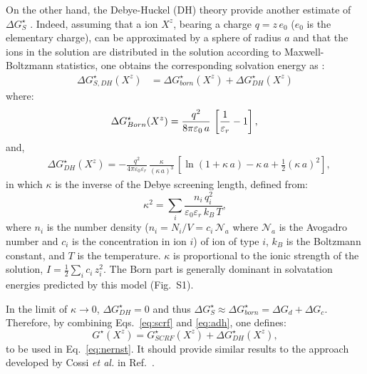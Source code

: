 \documentclass[review]{elsarticle}
\begin{document}
On the other hand, the Debye-Huckel (DH) theory provide another estimate of $\Delta G_{S}^\star$ \cite{bockrisModernElectrochemistryIonics1998}. Indeed, assuming that a ion $X^z$, bearing a charge $q = z\,e_0$ ($e_0$ is the elementary charge), can be approximated by a sphere of radius $a$ and that the ions in the solution are distributed in the solution according to Maxwell-Boltzmann statistics, one obtains the corresponding solvation energy as \cite{kontogeorgisDebyeHuckelTheoryIts2018,silvaDerivationsDebyeHuckel2022,silvaImprovingBornEquation2024}:\begin{align}
	\Delta G^\star_{S,DH}(X^z)
	&= \Delta G^\star_{born}(X^z) + \Delta G^\star_{DH}(X^z)\label{eq:adh}
\end{align}
where:
\begin{equation}
	\Delta G^\star_{Born}(X^z) =\frac{q^2}{8\pi\varepsilon_0\,a}\,\left[\frac{1}{\varepsilon_r}-1\right], \label{eq:born}\\
\end{equation}
and,
\begin{align}
	&\Delta G^\star_{DH}(X^z) = -\frac{q^2}{4\pi\varepsilon_0\varepsilon_r}\,\frac{\kappa}{(\kappa\,a)^3}\,\left[\ln(1+\kappa\,a)-\kappa\,a+\frac{1}{2}(\kappa\,a)^2\right],\label{eq:dh} \end{align}
in which $\kappa$ is the inverse of the Debye screening length, defined from:\begin{equation}
	\kappa^2 = \sum_i \frac{n_i\,q_i^2}{\varepsilon_0\varepsilon_r\,k_B\,T}, \label{eq:kappa2}
\end{equation}
where $n_i$ is the number density ($n_i = N_i / V = c_i\,\mathcal{N}_a$ where $\mathcal{N}_a$ is the Avogadro number and $c_i$ is the concentration in ion $i$) of ion of type $i$, $k_B$ is the Boltzmann constant, and $T$ is the temperature.  $\kappa$ is  proportional to the ionic strength of the solution, $I = \frac{1}{2}\sum_i c_i\,z_i^2$.  The Born part is generally dominant in solvatation energies predicted by this model (Fig.~S1).

In the limit of $\kappa\to 0$,  $\Delta G^\star_{DH} = 0$ and thus $\Delta G^\star_S \approx \Delta G^\star_{born} = \Delta G_d + \Delta G_c$.  Therefore, by combining Eqs.~\eqref{eq:scrf} and \eqref{eq:adh}, one defines:\begin{equation}
	G^\star(X^z) = G^\star_{SCRF}(X^z) + \Delta G^\star_{DH}(X^z), \label{eq:gtot}
\end{equation}
to be used in Eq.~\eqref{eq:nernst}. It should provide similar results to the approach developed by Cossi \emph{et al.} in Ref.~.
\end{document}

